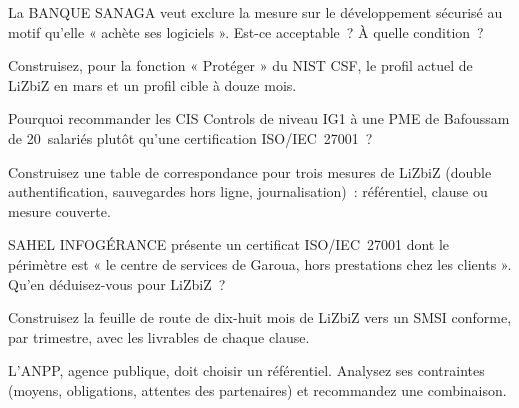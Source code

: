 \begin{boxexo}[title={\ding{45}\quad Exercice~10.4. Exclure \niveaumoyen}]
La BANQUE SANAGA veut exclure la mesure sur le développement sécurisé au
motif qu'elle « achète ses logiciels ». Est-ce acceptable~? À quelle
condition~?
\end{boxexo}

\begin{boxexo}[title={\ding{45}\quad Exercice~10.5. Profils \niveaumoyen}]
Construisez, pour la fonction « Protéger » du NIST CSF, le profil actuel
de LiZbiZ en mars et un profil cible à douze mois.
\end{boxexo}

\begin{boxexo}[title={\ding{45}\quad Exercice~10.6. IG1 \niveaumoyen}]
Pourquoi recommander les CIS Controls de niveau IG1 à une PME de
Bafoussam de 20~salariés plutôt qu'une certification ISO/IEC~27001~?
\end{boxexo}

\begin{boxexo}[title={\ding{45}\quad Exercice~10.7. Correspondance \niveaumoyen}]
Construisez une table de correspondance pour trois mesures de LiZbiZ
(double authentification, sauvegardes hors ligne, journalisation)~:
référentiel, clause ou mesure couverte.
\end{boxexo}

\begin{boxexo}[title={\ding{45}\quad Exercice~10.8. Un certificat \niveaumoyen}]
SAHEL INFOGÉRANCE présente un certificat ISO/IEC~27001 dont le périmètre
est « le centre de services de Garoua, hors prestations chez les
clients ». Qu'en déduisez-vous pour LiZbiZ~?
\end{boxexo}

\begin{boxexo}[title={\ding{45}\quad Exercice~10.9. Feuille de route \niveauexpert}]
Construisez la feuille de route de dix-huit mois de LiZbiZ vers un SMSI
conforme, par trimestre, avec les livrables de chaque clause.
\end{boxexo}

\begin{boxexo}[title={\ding{45}\quad Exercice~10.10. Choisir pour l'ANPP \niveauexpert}]
L'ANPP, agence publique, doit choisir un référentiel. Analysez ses
contraintes (moyens, obligations, attentes des partenaires) et
recommandez une combinaison.
\end{boxexo}

\bigskip

